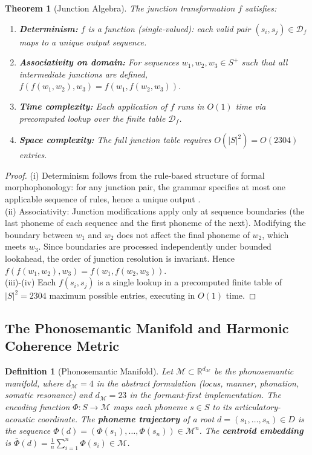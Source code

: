 \documentclass{article}
\newtheorem{theorem}{Theorem}
\newtheorem{definition}{Definition}
\begin{document}
\begin{theorem}[Junction Algebra]
\label{thm:sandhi}
The junction transformation $f$ satisfies:
\begin{enumerate}[label=(\roman*)]
  \item \textbf{Determinism:} $f$ is a function (single-valued): each valid pair $(s_i, s_j) \in \mathcal{D}_f$ maps to a unique output sequence.
  \item \textbf{Associativity on domain:} For sequences $w_1, w_2, w_3 \in S^+$ such that all intermediate junctions are defined, $f(f(w_1, w_2), w_3) = f(w_1, f(w_2, w_3))$.
  \item \textbf{Time complexity:} Each application of $f$ runs in $O(1)$ time via precomputed lookup over the finite table $\mathcal{D}_f$.
  \item \textbf{Space complexity:} The full junction table requires $O(|S|^2) = O(2304)$ entries.
\end{enumerate}
\end{theorem}

\begin{proof}
(i) Determinism follows from the rule-based structure of formal morphophonology: for any junction pair, the grammar specifies at most one applicable sequence of rules, hence a unique output \cite{cardona1997}.\\
(ii) Associativity: Junction modifications apply only at sequence boundaries (the last phoneme of each sequence and the first phoneme of the next). Modifying the boundary between $w_1$ and $w_2$ does not affect the final phoneme of $w_2$, which meets $w_3$. Since boundaries are processed independently under bounded lookahead, the order of junction resolution is invariant. Hence $f(f(w_1, w_2), w_3) = f(w_1, f(w_2, w_3))$.\\
(iii)-(iv) Each $f(s_i, s_j)$ is a single lookup in a precomputed finite table of $|S|^2 = 2304$ maximum possible entries, executing in $O(1)$ time.
\end{proof}

\subsection{The Phonosemantic Manifold and Harmonic Coherence Metric}
\label{sec:metric}

\begin{definition}[Phonosemantic Manifold]
Let $\mathcal{M} \subset \mathbb{R}^{d_\mathcal{M}}$ be the phonosemantic manifold, where $d_\mathcal{M} = 4$ in the abstract formulation (locus, manner, phonation, somatic resonance) and $d_\mathcal{M} = 23$ in the formant-first implementation. The encoding function $\Phi : S \to \mathcal{M}$ maps each phoneme $s \in S$ to its articulatory-acoustic coordinate. The \textbf{phoneme trajectory} of a root $d = (s_1, \ldots, s_n) \in D$ is the sequence $\Phi(d) = (\Phi(s_1), \ldots, \Phi(s_n)) \in \mathcal{M}^n$. The \textbf{centroid embedding} is $\bar{\Phi}(d) = \frac{1}{n}\sum_{i=1}^n \Phi(s_i) \in \mathcal{M}$.
\end{definition}
\end{document}
